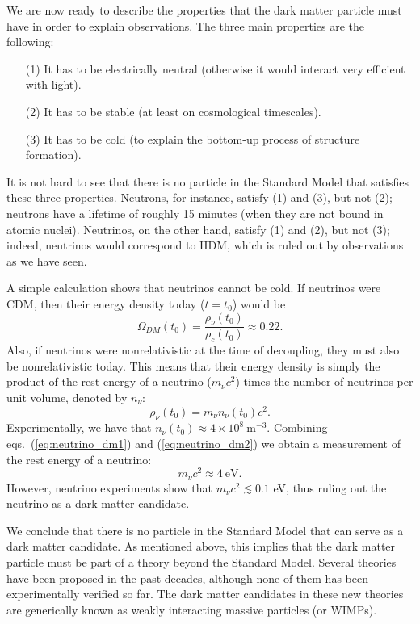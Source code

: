 We are now ready to describe the properties that the dark matter particle must have in order to explain observations. The three main properties are the following:
\begin{itemize}
\item [(1)] It has to be electrically neutral (otherwise it would interact very efficient with light).
\item [(2)] It has to be stable (at least on cosmological timescales).
\item [(3)] It has to be cold (to explain the bottom-up process of structure formation).
\end{itemize}
It is not hard to see that there is no particle in the Standard Model that satisfies these three properties. Neutrons, for instance, satisfy (1) and (3), but not (2); neutrons have a lifetime of roughly 15 minutes (when they are not bound in atomic nuclei). Neutrinos, on the other hand, satisfy (1) and (2), but not (3); indeed, neutrinos would correspond to HDM, which is ruled out by observations as we have seen.

A simple calculation shows that neutrinos cannot be cold. If neutrinos were CDM, then their energy density today ($t=t_0$) would be
\begin{equation} \label{eq:neutrino_dm1}
\Omega_{DM}(t_0)= \frac{\rho_{\nu}(t_0)}{\rho_c(t_0)} \approx 0.22.
\end{equation}
Also, if neutrinos were nonrelativistic at the time of decoupling, they must also be nonrelativistic today. This means that their energy density is simply the product of the rest energy of a neutrino ($m_{\nu}c^2$) times the number of neutrinos per unit volume, denoted by $n_{\nu}$:
\begin{equation} \label{eq:neutrino_dm2}
\rho_{\nu}(t_0)=m_{\nu}n_{\nu}(t_0)c^2.
\end{equation}
Experimentally, we have that $n_{\nu}(t_0)\approx 4\times10^8~\mathrm{m^{-3}}$. Combining eqs.\ (\ref{eq:neutrino_dm1}) and (\ref{eq:neutrino_dm2}) we obtain a measurement of the rest energy of a neutrino:
\begin{equation}
m_{\nu}c^2\approx 4~\mathrm{eV}.
\end{equation}
However, neutrino experiments show that $m_{\nu}c^2 \lesssim 0.1$ eV, thus ruling out the neutrino as a dark matter candidate.

We conclude that there is no particle in the Standard Model that can serve as a dark matter candidate. As mentioned above, this implies that the dark matter particle must be part of a theory beyond the Standard Model. Several theories have been proposed in the past decades, although none of them has been experimentally verified so far. The dark matter candidates in these new theories are generically known as weakly interacting massive particles (or WIMPs).

